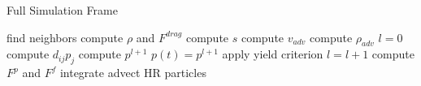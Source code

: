 \documentclass[intern]{cgMA}
\begin{document}
    \begin{algorithm}[H]
        \caption{Full Simulation Frame}
        \label{alg:main}
        \begin{algorithmic}[1]
        \State find neighbors 
        \State compute $\rho$ and $F^{drag}$ 
        \State compute $s$ 
        \State compute $v_{adv}$
        \State compute $\rho_{adv}$
        \State $l = 0$
            \State compute $d_{ij}p_{j}$
            \State compute $p^{l+1}$
            \State $p(t) = p^{l+1}$
            \State apply yield criterion 
            \State $l = l+1$
        \EndWhile
        \State compute $F^p$ and $F^f$ 
        \State integrate 
        \State advect HR particles 
        \end{algorithmic}
    \end{algorithm}
\end{document}
